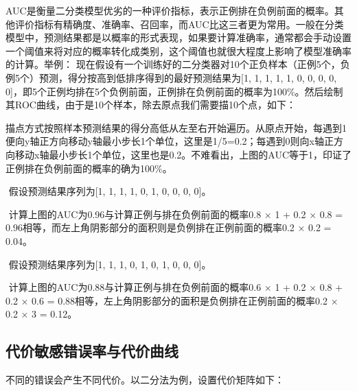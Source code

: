 ​
AUC是衡量二分类模型优劣的一种评价指标，表示正例排在负例前面的概率。其他评价指标有精确度、准确率、召回率，而AUC比这三者更为常用。
​
一般在分类模型中，预测结果都是以概率的形式表现，如果要计算准确率，通常都会手动设置一个阈值来将对应的概率转化成类别，这个阈值也就很大程度上影响了模型准确率的计算。
​ 举例： ​
现在假设有一个训练好的二分类器对10个正负样本（正例5个，负例5个）预测，得分按高到低排序得到的最好预测结果为{[}1,
1, 1, 1, 1, 0, 0, 0, 0,
0{]}，即5个正例均排在5个负例前面，正例排在负例前面的概率为100\%。然后绘制其ROC曲线，由于是10个样本，除去原点我们需要描10个点，如下：


​
描点方式按照样本预测结果的得分高低从左至右开始遍历。从原点开始，每遇到1便向y轴正方向移动y轴最小步长1个单位，这里是1/5=0.2；每遇到0则向x轴正方向移动x轴最小步长1个单位，这里也是0.2。不难看出，上图的AUC等于1，印证了正例排在负例前面的概率的确为100\%。

​ 假设预测结果序列为{[}1, 1, 1, 1, 0, 1, 0, 0, 0, 0{]}。


​ 计算上图的AUC为0.96与计算正例与排在负例前面的概率0.8 × 1 + 0.2 × 0.8 =
0.96相等，而左上角阴影部分的面积则是负例排在正例前面的概率0.2 × 0.2 =
0.04。

​ 假设预测结果序列为{[}1, 1, 1, 0, 1, 0, 1, 0, 0, 0{]}。

 

​ 计算上图的AUC为0.88与计算正例与排在负例前面的概率0.6 × 1 + 0.2 × 0.8 +
0.2 × 0.6 = 0.88相等，左上角阴影部分的面积是负例排在正例前面的概率0.2 ×
0.2 × 3 = 0.12。

\subsection{代价敏感错误率与代价曲线}\label{ux4ee3ux4ef7ux654fux611fux9519ux8befux7387ux4e0eux4ee3ux4ef7ux66f2ux7ebf}

不同的错误会产生不同代价。以二分法为例，设置代价矩阵如下：

